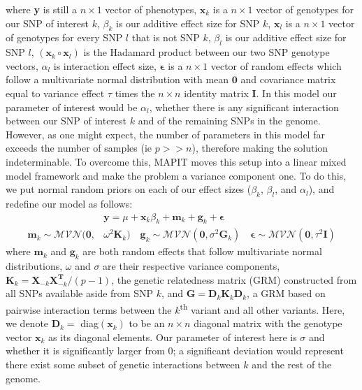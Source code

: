 \documentclass[12pt, a4paper]{article}
\begin{document}
where \textbf{y} is still a $n \times 1$ vector of phenotypes, $\textbf{x}_k$ is a $n \times 1$ vector of genotypes for our SNP of interest $k$, $\beta_k$ is our additive effect size for SNP $k$, $\textbf{x}_l$ is a $n \times 1$ vector of genotypes for every SNP $l$ that is not SNP $k$, $\beta_l$ is our additive effect size for SNP $l$, $(\textbf{x}_k \circ \textbf{x}_l)$ is the Hadamard product between our two SNP genotype vectors, $\alpha_l$ is interaction effect size, $\boldsymbol{\epsilon}$ is a $n \times 1$ vector of random effects which follow a multivariate normal distribution with mean $\textbf{0}$ and covariance matrix equal to variance effect $\tau$ times the $n \times n$ identity matrix $\textbf{I}$. In this model our parameter of interest would be $\alpha_l$, whether there is any significant interaction between our SNP of interest $k$ and of the remaining SNPs in the genome. However, as one might expect, the number of parameters in this model far exceeds the number of samples (ie $p >> n$), therefore making the solution indeterminable. To overcome this, MAPIT moves this setup into a linear mixed model framework and make the problem a variance component one. To do this, we put normal random priors on each of our effect sizes ($\beta_k$, $\beta_l$, and $\alpha_l$), and redefine our model as follows:
\begin{align}
    & \textbf{y} = \mu + \textbf{x}_k\beta_k + \textbf{m}_k + \textbf{g}_k + \boldsymbol{\epsilon} \\
    \textbf{m}_k \sim \mathcal{MVN}(\textbf{0}, &\omega^{2}\textbf{K}_k) \quad \textbf{g}_k \sim \mathcal{MVN}(\textbf{0}, \sigma^{2}\textbf{G}_k) \quad \boldsymbol{\epsilon} \sim \mathcal{MVN}(\textbf{0}, \tau^{2}\textbf{I}) \nonumber 
\end{align}
where $\textbf{m}_k$ and $\textbf{g}_k$ are both random effects that follow multivariate normal distributions, $\omega$ and $\sigma$ are their respective variance components, $\textbf{K}_k = \textbf{X}_{-k}\textbf{X}^{\textbf{T}}_{-k}/(p-1)$, the genetic relatedness matrix (GRM) constructed from all SNPs available aside from SNP $k$, and $\textbf{G} = \textbf{D}_k\textbf{K}_k\textbf{D}_k$, a GRM based on pairwise interaction terms between the $k$\textsuperscript{th} variant and all other variants. Here, we denote $\textbf{D}_k =$ diag$(\textbf{x}_k)$ to be an $n \times n$ diagonal matrix with the genotype vector $\textbf{x}_k$ as its diagonal elements. Our parameter of interest here is $\sigma$ and whether it is significantly larger from 0; a significant deviation would represent there exist some subset of genetic interactions between $k$ and the rest of the genome.
\end{document}
